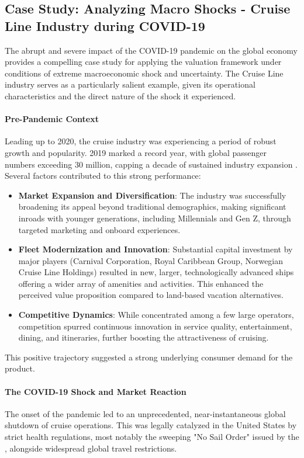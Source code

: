 \subsection{Case Study: Analyzing Macro Shocks - Cruise Line Industry during COVID-19} \label{subsec:cruise_line_example}
The abrupt and severe impact of the COVID-19 pandemic on the global economy provides a compelling case study for applying the valuation framework under conditions of extreme macroeconomic shock and uncertainty. The Cruise Line industry serves as a particularly salient example, given its operational characteristics and the direct nature of the shock it experienced.

\paragraph{Pre-Pandemic Context}
Leading up to 2020, the cruise industry was experiencing a period of robust growth and popularity. 2019 marked a record year, with global passenger numbers exceeding 30 million, capping a decade of sustained industry expansion \parencite{clia2021state}. Several factors contributed to this strong performance:
\begin{itemize}
    \item \textbf{Market Expansion and Diversification}: The industry was successfully broadening its appeal beyond traditional demographics, making significant inroads with younger generations, including Millennials and Gen Z, through targeted marketing and onboard experiences.
    \item \textbf{Fleet Modernization and Innovation}: Substantial capital investment by major players (Carnival Corporation, Royal Caribbean Group, Norwegian Cruise Line Holdings) resulted in new, larger, technologically advanced ships offering a wider array of amenities and activities. This enhanced the perceived value proposition compared to land-based vacation alternatives.
    \item \textbf{Competitive Dynamics}: While concentrated among a few large operators, competition spurred continuous innovation in service quality, entertainment, dining, and itineraries, further boosting the attractiveness of cruising.
\end{itemize}
This positive trajectory suggested a strong underlying consumer demand for the product.

\paragraph{The COVID-19 Shock and Market Reaction}
The onset of the pandemic led to an unprecedented, near-instantaneous global shutdown of cruise operations. This was legally catalyzed in the United States by strict health regulations, most notably the sweeping "No Sail Order" issued by the \textcite{cdc2020nosail}, alongside widespread global travel restrictions.

